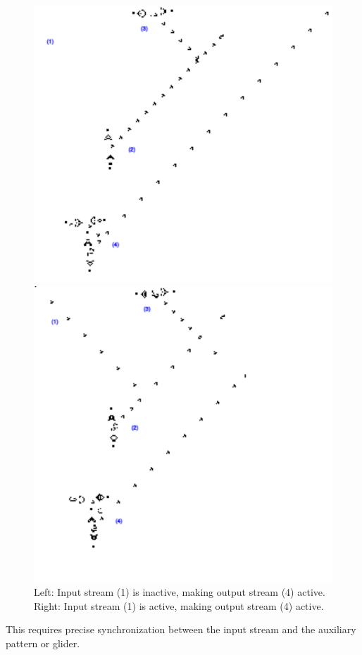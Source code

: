 \documentclass{article}
\theoremstyle{definition}
\theoremstyle{plain}
\theoremstyle{plain}
\begin{document}
\begin{figure}[H]
  \centering
  \begin{minipage}{0.45\textwidth}
    \centering
    \includegraphics[width=\linewidth]{figures/notGo.png}
  \end{minipage}\hfill
  \begin{minipage}{0.45\textwidth}
    \centering
    \includegraphics[width=\linewidth]{figures/notNoGo.png}
  \end{minipage}
  \caption{Left: Input stream (1) is inactive, making output stream (4) active. Right: Input stream (1) is active, making output stream (4) active. \cite{Carlini_2020}}
  \label{fig:not-gate-collision} %
\end{figure}
This requires precise synchronization between the input stream and the auxiliary pattern or glider.
\end{document}
